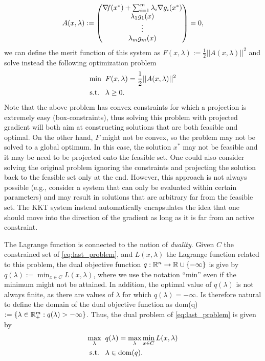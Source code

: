 \documentclass[10pt,a4paper]{article}
\begin{document}
\begin{equation*}
	A (x,\lambda) :=
	\begin{pmatrix}
		\operatorname*{\mathit{\nabla \!f}}(x^*)+ \sum_{i=1}^{m} \lambda_i \nabla g_i(x^*)\\
		\lambda_1 g_1(x)\\
		\vdots\\
		\lambda_m g_m(x)
	\end{pmatrix}=0,
\end{equation*}
we can define the merit function of this system as $F(x,\lambda) := \frac{1}{2}||A(x,\lambda)||^2$ and solve instead the following optimization problem
\begin{equation*}
	\begin{split}
		\min \;\; &F(x,\lambda)= \frac{1}{2}||A(x,\lambda)||^2\\
		\text{s.t.} \;\;\;& \lambda\geq 0.
	\end{split}
\end{equation*}
Note that the above problem has convex constraints for which a projection is extremely easy (box-constraints), thus solving this problem with projected gradient will both aim at constructing solutions that are both feasible and optimal. On the other hand, $F$ might not be convex, so the problem may not be solved to a global optimum. In this case, the solution $x^*$ may not be feasible and it may be need to be projected onto the feasible set. One could also consider solving the original problem ignoring the constraints and projecting the solution back to the feasible set only at the end. However, this approach is not always possible (e.g., consider a system that can only be evaluated within certain parameters) and may result in solutions that are arbitrary far from the feasible set. The KKT system instead automatically encapsulates the idea that one should move into the direction of the gradient as long as it is far from an active constraint.

\begin{remark}
	The Lagrange function is connected to the notion of \textit{duality}. Given $C$ the constrained set of \eqref{eq:last_problem}, and $L(x,\lambda)$ the Lagrange function related to this problem, the dual objective function $q:\mathbb{R}^n\to \mathbb{R} \cup \{-\infty\}$ is give by $q(\lambda) := \min_{x\in C} L(x,\lambda)$, where we use the notation ``min'' even if the minimum might not be attained. In addition, the optimal value of $q(\lambda)$ is not always finite, as there are values of $\lambda$ for which $q(\lambda) = -\infty$. Is therefore natural to define the domain of the dual objective function as dom(q)$:=\{\lambda \in \mathbb{R}^m_+: q(\lambda)>-\infty\}$. Thus, the dual problem of \eqref{eq:last_problem} is given by 
	\begin{equation*}
		\begin{split}
			\max_\lambda \;\; &q(\lambda) = \max_\lambda \min_{x\in C} L(x,\lambda)\\
			\text{s.t.} \;\;\;& \lambda\in \text{dom}(q).
		\end{split}
	\end{equation*}
\end{remark}
 


\end{document}
